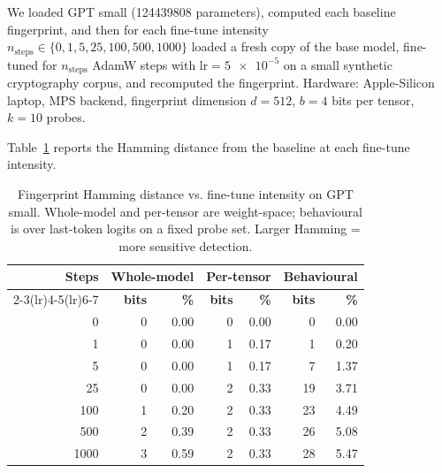 \documentclass[11pt,a4paper]{article}
\begin{document}
We loaded GPT small (\num{124439808} parameters), computed
each baseline fingerprint, and then for each fine\nobreakdash-tune
intensity $n_\mathrm{steps} \in \{0, 1, 5, 25, 100, 500, 1000\}$
loaded a fresh copy of the base model, fine\nobreakdash-tuned for
$n_\mathrm{steps}$ AdamW steps with $\mathrm{lr} = \num{5e-5}$ on a
small synthetic cryptography corpus, and recomputed the fingerprint.
Hardware: Apple\nobreakdash-Silicon laptop, MPS backend, fingerprint
dimension $d = 512$, $b = 4$ bits per tensor, $k = 10$ probes.

Table~\ref{tab:model:sweep} reports the Hamming distance from the
baseline at each fine\nobreakdash-tune intensity.

\begin{table}[h]
  \centering
  \caption{Fingerprint Hamming distance vs. fine\nobreakdash-tune
    intensity on GPT small.  Whole\nobreakdash-model and
    per\nobreakdash-tensor are weight\nobreakdash-space; behavioural is
    over last\nobreakdash-token logits on a fixed probe set.  Larger
    Hamming = more sensitive detection.}
  \label{tab:model:sweep}
  \begin{tabular}{r r r r r r r}
    \toprule
    \multirow{2}{*}{\textbf{Steps}} &
    \multicolumn{2}{c}{\textbf{Whole-model}} &
    \multicolumn{2}{c}{\textbf{Per-tensor}} &
    \multicolumn{2}{c}{\textbf{Behavioural}} \\
    \cmidrule(lr){2-3}\cmidrule(lr){4-5}\cmidrule(lr){6-7}
       & \textbf{bits} & \textbf{\%} & \textbf{bits} & \textbf{\%} & \textbf{bits} & \textbf{\%} \\
    \midrule
    0      & 0 & 0.00 & 0 & 0.00 &  0 & 0.00 \\
    1      & 0 & 0.00 & 1 & 0.17 &  1 & 0.20 \\
    5      & 0 & 0.00 & 1 & 0.17 &  7 & 1.37 \\
    25     & 0 & 0.00 & 2 & 0.33 & 19 & 3.71 \\
    100    & 1 & 0.20 & 2 & 0.33 & 23 & 4.49 \\
    500    & 2 & 0.39 & 2 & 0.33 & 26 & 5.08 \\
    1000   & 3 & 0.59 & 2 & 0.33 & 28 & 5.47 \\
    \bottomrule
  \end{tabular}
\end{table}
\end{document}
